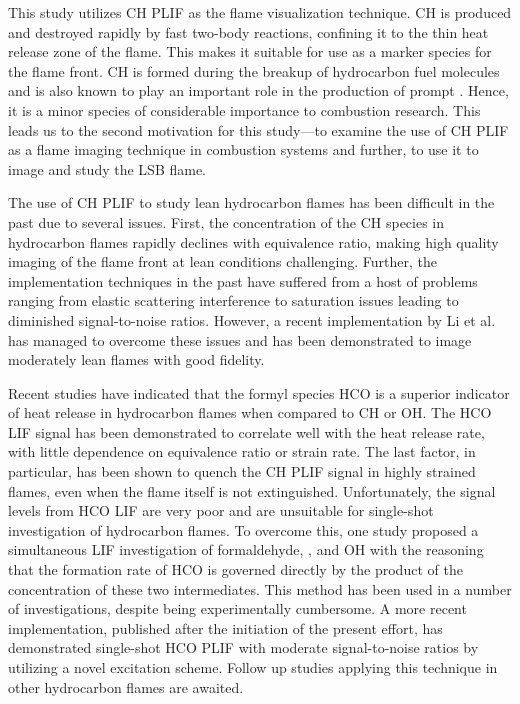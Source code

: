 This study utilizes CH PLIF as the flame visualization technique.
CH is produced and destroyed rapidly by fast two-body reactions, confining it to the thin heat release zone of the flame.
This makes it suitable for use as a marker species for the flame front.\cite{2005-vagelopoulos}
CH is formed during the breakup of hydrocarbon fuel molecules\cite{2010-kohler} and is also known to play an important role in the production of prompt .\cite{1971-fenimore}
Hence, it is a minor species of considerable importance to combustion research.
This leads us to the second motivation for this study---to examine the use of CH PLIF as a flame imaging technique in combustion systems and further, to use it to image and study the LSB flame.

The use of CH PLIF to study lean hydrocarbon flames has been difficult in the past due to several issues.
First, the concentration of the CH species in hydrocarbon flames rapidly declines with equivalence ratio, making high quality imaging of the flame front at lean conditions challenging.
Further, the implementation techniques in the past have suffered from a host of problems ranging from elastic scattering interference to saturation issues leading to diminished signal-to-noise ratios.
However, a recent implementation by Li et al.\cite{2007-li-a} has managed to overcome these issues and has been demonstrated to image moderately lean flames with good fidelity.

Recent studies\cite{1998-najm} have indicated that the formyl species HCO is a superior indicator of heat release in hydrocarbon flames when compared to CH or OH.
The HCO LIF signal has been demonstrated to correlate well with the heat release rate, with little dependence on equivalence ratio or strain rate.
The last factor, in particular, has been shown to quench the CH PLIF signal\cite{2008-kiefer} in highly strained flames, even when the flame itself is not extinguished.
Unfortunately, the signal levels from HCO LIF are very poor\cite{1998-najm,1998-paul} and are unsuitable for single-shot investigation of hydrocarbon flames.
To overcome this, one study\cite{1998-paul} proposed a simultaneous LIF investigation of formaldehyde, , and OH with the reasoning that the formation rate of HCO is governed directly by the product of the concentration of these two intermediates.
This method has been used in a number of investigations,\cite{2006-ayoola} despite being experimentally cumbersome.
A more recent implementation\cite{2009-kiefer}, published after the initiation of the present effort, has demonstrated single-shot HCO PLIF with moderate signal-to-noise ratios by utilizing a novel excitation scheme.
Follow up studies applying this technique in other hydrocarbon flames are awaited.

